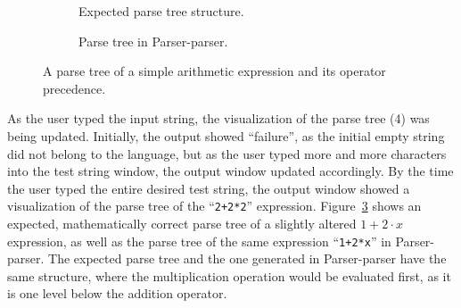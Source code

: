 \documentclass[english,bachelors,forcepolishlogotype]{wizthesis}
\newcommand{\thisproject}{Parser-parser}
\begin{document}
\begin{figure}[H]
  \centering
  \begin{subfigure}[b]{0.49\textwidth}
    \centering
    \caption{Expected parse tree structure.}
    \label{fig:expected-parse-tree}
  \end{subfigure}
  \hfill
  \begin{subfigure}[b]{0.49\textwidth}
    \centering
    \caption{Parse tree in \thisproject{}.}
    \label{fig:actual-parse-tree}
  \end{subfigure}
  \caption{A parse tree of a simple arithmetic expression and its operator
  precedence.}
  \label{fig:parser-parser-parse-tree-example}
\end{figure}

As the user typed the input string, the visualization of the parse tree (4) was
being updated. Initially, the output showed ``failure'', as the initial empty
string did not belong to the language, but as the user typed more and more
characters into the test string window, the output window updated accordingly.
By the time the user typed the entire desired test string, the output window
showed a visualization of the parse tree of the ``\texttt{2+2*2}'' expression.
Figure~\ref{fig:parser-parser-parse-tree-example} shows an expected,
mathematically correct parse tree of a slightly altered $1 + 2 \cdot x$
expression, as well as the parse tree of the same expression ``\texttt{1+2*x}''
in \thisproject{}. The expected parse tree and the one generated in
\thisproject{} have the same structure, where the multiplication operation would
be evaluated first, as it is one level below the addition operator.
\end{document}
